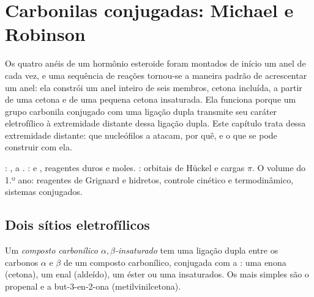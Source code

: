 \chapter{Carbonilas conjugadas: Michael e Robinson}\label{ch:b2:conjugate-additions}

Os quatro anéis de um hormônio esteroide foram montados de início um anel de cada vez, e uma
sequência de reações tornou-se a maneira padrão de acrescentar um anel: ela constrói um anel inteiro
de seis membros, cetona incluída, a partir de uma cetona e de uma pequena cetona insaturada. Ela
funciona porque um grupo carbonila conjugado com uma ligação dupla  transmite seu caráter
eletrofílico à extremidade distante dessa ligação dupla. Este capítulo trata dessa extremidade
distante: que nucleófilos a atacam, por quê, e o que se pode construir com ela.

\begin{recall}
: , a . :  e , reagentes duros e moles. : orbitais de Hückel e cargas
$\pi$. O volume do 1.º ano: reagentes de Grignard e hidretos, controle cinético e termodinâmico,
sistemas conjugados.
\end{recall}

\section{Dois sítios eletrofílicos}

\begin{definition}\label{def:b2:conjugate-additions:enone}
Um \emph{composto carbonílico $\alpha,\beta$-insaturado}
tem uma ligação dupla  entre os carbonos $\alpha$
e $\beta$ de um composto carbonílico, conjugada com a : uma enona (cetona), um enal
(aldeído), um éster ou uma  insaturados. Os mais simples são o propenal  e a
but-3-en-2-ona  (metilvinilcetona).
\end{definition}

